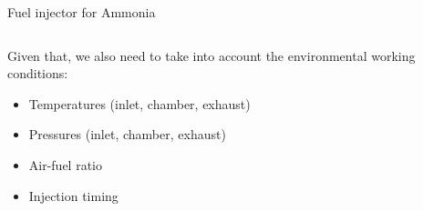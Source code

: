 \begin{frame}{Fuel injector for Ammonia}
\begin{columns}[c, onlytextwidth]
\begin{column}{0.6\textwidth}
            \vspace{9pt}

            Given that, we also need to take into account the environmental working conditions:

            \begin{itemize}
                \item Temperatures (inlet, chamber, exhaust)
                \item Pressures (inlet, chamber, exhaust)
                \item Air-fuel ratio
                \item Injection timing
            \end{itemize}

        \end{column}

    \end{columns}

\end{frame}
